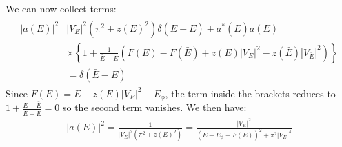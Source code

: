 \documentclass[a4paper,11pt]{article}
\numberwithin{equation}{section}
\begin{document}
We can now collect terms:
\begin{align}
 \begin{split}
  |a(E)|^2&|V_E|^2(\pi^2+z(E)^2)\delta(\bar{E}-E)+a^*(\bar{E})a(E)\\
      &\times\left\{1+\frac{1}{\bar{E}-E}\left(F(E)-F(\bar{E})
         +z(E)|V_E|^2-z(\bar{E})|V_{\bar{E}}|^2  \right) \right\}\\
         &=\delta(\bar{E}-E)
 \end{split}
\end{align}
Since $F(E)=E-z(E)|V_E|^2-E_\phi$, the term inside the brackets reduces to $1+\frac{E-\bar{E}}{\bar{E}-E}=0$ so the second term vanishes.
We then have:
\begin{align}
 |a(E)|^2 =\frac{1}{|V_E|^2(\pi^2+z(E)^2)}=\frac{|V_E|^2}{(E-E_\phi-F(E))^2+\pi^2|V_E|^4}
\end{align}
\\
\end{document}

